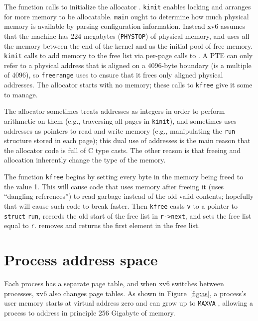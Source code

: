 The function
calls
to initialize the allocator
.
\lstinline{kinit}
enables locking and arranges for more memory to be allocatable.
\lstinline{main}
ought to determine how much physical
memory is available by parsing configuration information.
Instead xv6 assumes that the machine has
224 megabytes
(\lstinline{PHYSTOP})
of physical memory, and uses all the memory between the end of the kernel
and
as the initial pool of free memory.
\lstinline{kinit}
calls
to add memory to the free list via per-page calls to
.
A PTE can only refer to a physical address that is aligned
on a 4096-byte boundary (is a multiple of 4096), so
\lstinline{freerange}
uses
to ensure that it frees only aligned physical addresses.
The allocator starts with no memory;
these calls to
\lstinline{kfree}
give it some to manage.

The allocator sometimes treats addresses as integers
in order to perform arithmetic on them (e.g.,
traversing all pages in
\lstinline{kinit}),
and sometimes uses addresses as pointers to read and
write memory (e.g., manipulating the
\lstinline{run}
structure stored in each page);
this dual use of addresses is the main reason that the
allocator code is full of C type casts.
The other reason is that freeing and allocation inherently
change the type of the memory.

The function
\lstinline{kfree}
begins by setting every byte in the
memory being freed to the value 1.
This will cause code that uses memory after freeing it
(uses ``dangling references'')
to read garbage instead of the old valid contents;
hopefully that will cause such code to break faster.
Then
\lstinline{kfree}
casts
\lstinline{v}
to a pointer to
\lstinline{struct}
\lstinline{run},
records the old start of the free list in
\lstinline{r->next},
and sets the free list equal to
\lstinline{r}.
removes and returns the first element in the free list.

\section{Process address space}

Each process has a separate page table, and when xv6 switches between
processes, xv6 also changes page tables.
As shown in
Figure~\ref{fig:as},
a process's user memory starts at virtual address
zero and can grow up to
\texttt{MAXVA}
,
allowing a process to address in principle 256 Gigabyte of memory.

